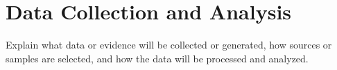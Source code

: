 \section{Data Collection and Analysis}
Explain what data or evidence will be collected or generated, 
how sources or samples are selected, and how the data will be 
processed and analyzed.